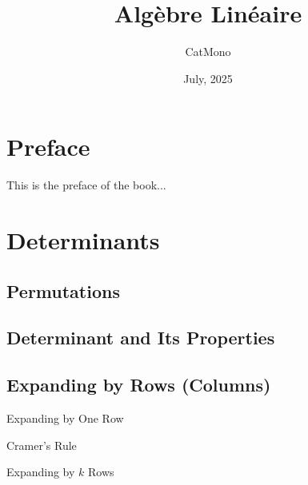 \documentclass[11pt]{../../TexTemplate/elegantbook} %
\title{Algèbre Linéaire} %
\author{CatMono} %
\date{July, 2025} %
\begin{document}
\maketitle %

\frontmatter        %
\tableofcontents    %

\chapter{Preface}   %
This is the preface of the book...

\mainmatter         %

\chapter{Determinants} %
\section{Permutations} %

\section{Determinant and Its Properties} %

\section{Expanding by Rows (Columns)} %
\begin{leftbarTitle}{Expanding by One Row}\end{leftbarTitle}

\begin{leftbarTitle}{Cramer's Rule}\end{leftbarTitle}

\begin{leftbarTitle}{Expanding by \(k\) Rows}\end{leftbarTitle}
\end{document}
